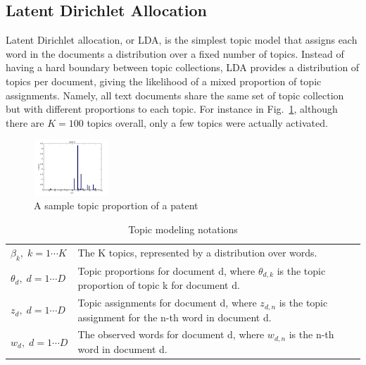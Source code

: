 \documentclass[conference]{IEEEtran}
\begin{document}
\subsection{Latent Dirichlet Allocation}
Latent Dirichlet allocation, or LDA, is the simplest topic model \cite{lda2003} that assigns each word in the documents a distribution over a fixed number of topics. Instead of having a hard boundary between topic collections, LDA provides a distribution of topics per document, giving the likelihood of a mixed proportion of topic assignments. Namely, all text documents share the same set of topic collection but with different proportions to each topic. For instance in Fig.~\ref{topic_proportion}, although there are $K=100$ topics overall, only a few topics were actually activated.

\begin{figure}[h]
	\center
	\includegraphics[width=0.25\textwidth]{fig/pat8_topics.png}
	\caption{A sample topic proportion of a patent}
	\label{topic_proportion}
\end{figure}




\begin{table}[h]
	\center
	\begin{tabular}{l p{5.5cm}}
$\beta_k,\; k = 1 \cdots K$& The K topics, represented by a distribution over words.\\
$\theta_d,\; d = 1 \cdots D$& Topic proportions for document d, where $\theta_{d,k}$ is the topic proportion of topic k for document d.\\
$z_d,\; d = 1 \cdots D$& Topic assignments for document d, where $z_{d,n}$ is the topic assignment for the n-th word in document d.\\
$w_d,\; d = 1 \cdots D$& The observed words for document d, where $w_{d,n}$ is the n-th word in document d.\\
	\end{tabular}
	\caption{Topic modeling notations}
	\label{tm_notations}
\end{table}
	
\end{document}
